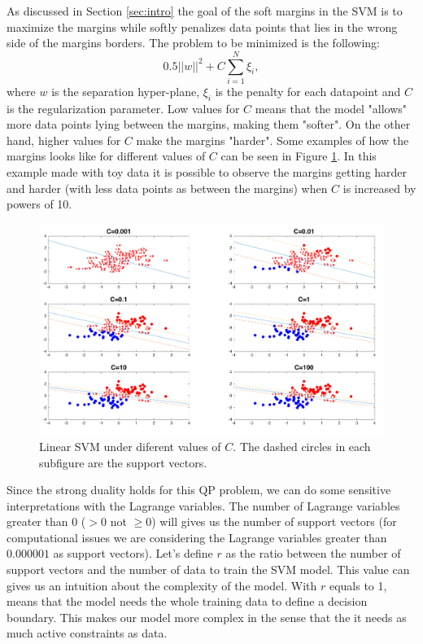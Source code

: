 \label{sec:complexity}

As discussed in Section \ref{sec:intro} the goal of the soft margins in the SVM is to maximize the margins while softly penalizes data points that lies in the wrong side of the margins borders.
The problem to be minimized is the following:
\begin{equation}
  0.5 ||w||^2 + C \sum_{i=1}^{N}\xi_i,
\end{equation}
where $w$ is the separation hyper-plane, $\xi_i$ is the penalty for each datapoint and $C$ is the regularization parameter.
Low values for $C$ means that the model "allows" more data points lying between the margins, making them "softer".
On the other hand, higher values for $C$ make the margins "harder".
Some examples of how the margins looks like for different values of $C$ can be seen in Figure \ref{fig:svm}.
In this example made with toy data it is possible to observe the margins getting harder and harder (with less data points as between the margins) when $C$ is increased by powers of 10.

\begin{figure}[!htb]
\begin{center}
\includegraphics [width=12.5cm] {./graphics/SVM_PLOT.png}
\caption{Linear SVM under diferent values of $C$. The dashed circles in each subfigure are the support vectors.} \label{fig:svm}
\end{center}
\end{figure}

Since the strong duality holds for this QP problem, we can do some sensitive interpretations with the Lagrange variables.
The number of Lagrange variables greater than $0$ ($>0$ not $\geq 0$) will gives us the number of support vectors (for computational issues we are considering the Lagrange variables greater than $0.000001$ as support vectors).
Let's define $r$ as the ratio between the number of support vectors and the number of data to train the SVM model.
This value can gives us an intuition about the complexity of the model.
With $r$ equals to 1, means that the model needs the whole training data to define a decision boundary.
This makes our model more complex in the sense that the it needs as much active constraints as data.

